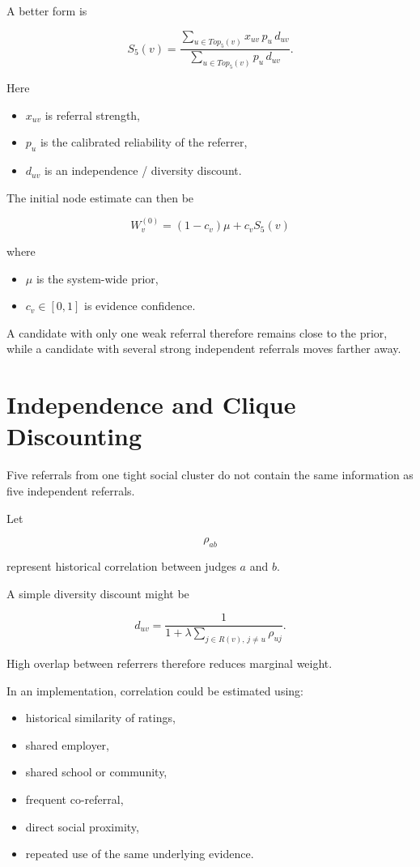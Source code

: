 \documentclass[11pt]{article}
\begin{document}
A better form is

\[
S_5(v)
=
\frac{
\sum\limits_{u \in Top_5(v)}
x_{uv}\,p_u\,d_{uv}
}{
\sum\limits_{u \in Top_5(v)}
p_u\,d_{uv}
}.
\]

Here

\begin{itemize}
    \item \(x_{uv}\) is referral strength,
    \item \(p_u\) is the calibrated reliability of the referrer,
    \item \(d_{uv}\) is an independence / diversity discount.
\end{itemize}

The initial node estimate can then be

\[
\boxed{
W_v^{(0)}
=
(1-c_v)\mu
+
c_v S_5(v)
}
\]

where

\begin{itemize}
    \item \(\mu\) is the system-wide prior,
    \item \(c_v \in [0,1]\) is evidence confidence.
\end{itemize}

A candidate with only one weak referral therefore remains close to the prior,
while a candidate with several strong independent referrals moves farther away.

\section{Independence and Clique Discounting}

Five referrals from one tight social cluster do not contain the same
information as five independent referrals.

Let

\[
\rho_{ab}
\]

represent historical correlation between judges \(a\) and \(b\).

A simple diversity discount might be

\[
d_{uv}
=
\frac{1}{
1 + \lambda
\sum_{j \in R(v),\, j\neq u}
\rho_{uj}
}.
\]

High overlap between referrers therefore reduces marginal weight.

In an implementation, correlation could be estimated using:

\begin{itemize}
    \item historical similarity of ratings,
    \item shared employer,
    \item shared school or community,
    \item frequent co-referral,
    \item direct social proximity,
    \item repeated use of the same underlying evidence.
\end{itemize}
\end{document}
